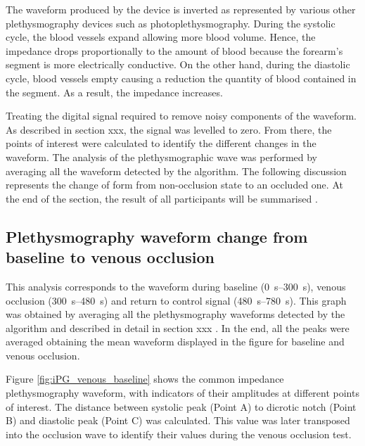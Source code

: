 The waveform produced by the device is inverted as represented by various other plethysmography devices such as photoplethysmography. During the systolic cycle, the blood vessels expand allowing more blood volume. Hence, the impedance drops proportionally to the amount of blood because the forearm's segment is more electrically conductive. On the other hand, during the diastolic cycle, blood vessels empty causing a reduction the quantity of blood contained in the segment. As a result, the impedance increases.  

Treating the digital signal required to remove noisy components of the waveform. As described in section xxx, the signal was levelled to zero.  From there, the points of interest were calculated to identify the different changes in the waveform. The analysis of the plethysmographic wave was performed by averaging all the waveform detected by the algorithm. The following discussion represents the change of form from non-occlusion state to an occluded one. At the end of the section, the result of all participants will be summarised .

\subsection{Plethysmography waveform change from baseline to venous occlusion}
\label{section results 3.1}
This analysis corresponds to the waveform during baseline (\SIrange{0}{300}{\second}), venous occlusion (\SIrange{300}{480}{\second}) and return to control signal (\SIrange{480}{780}{\second}). This graph was obtained by averaging all the plethysmography waveforms detected by the algorithm and described in detail in section xxx . In the end, all the peaks were averaged obtaining the mean waveform displayed in the figure for baseline and venous occlusion.

Figure \ref{fig:iPG_venous_baseline} shows the common impedance plethysmography waveform, with indicators of their amplitudes at different points of interest. The distance between systolic peak (Point A) to dicrotic notch (Point B) and diastolic peak (Point C) was calculated. This value was later transposed into the occlusion wave to identify their values during the venous occlusion test.

